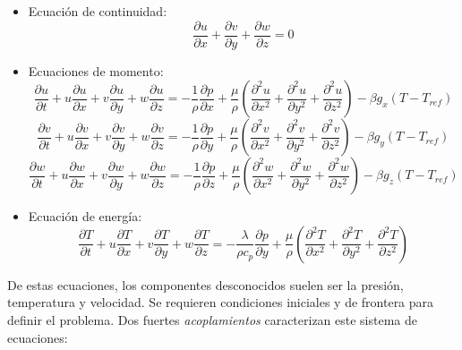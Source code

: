 \begin{itemize}
	\item Ecuaci\'on de continuidad:
	\begin{equation*}
		\frac{\partial u}{\partial x} + \frac{\partial v}{\partial y} + \frac{\partial w}{\partial z} = 0
	\end{equation*}
	\item Ecuaciones de momento:
	\begin{equation*}
			\frac{\partial u}{\partial t} + u \frac{\partial u}{\partial x} + v \frac{\partial u}{\partial y} + w \frac{\partial u}{\partial z} = - \frac{1}{\rho} \frac{\partial p}{\partial x} + \frac{\mu}{\rho} \left( \frac{\partial ^2 u}{\partial x ^2} + \frac{\partial ^2 u}{\partial y ^2} + \frac{\partial ^2 u}{\partial z ^2} \right) - \beta g_x \left(T - T_{ref} \right)
	\end{equation*}
	\begin{equation*}
			\frac{\partial v}{\partial t} + u \frac{\partial v}{\partial x} + v \frac{\partial v}{\partial y} + w \frac{\partial v}{\partial z} = - \frac{1}{\rho} \frac{\partial p}{\partial y} + \frac{\mu}{\rho} \left( \frac{\partial ^2 v}{\partial x ^2} + \frac{\partial ^2 v}{\partial y ^2} + \frac{\partial ^2 v}{\partial z ^2} \right) - \beta g_y \left(T - T_{ref} \right)
	\end{equation*}
	\begin{equation*}
			\frac{\partial w}{\partial t} + u \frac{\partial w}{\partial x} + v \frac{\partial w}{\partial y} + w \frac{\partial w}{\partial z} = - \frac{1}{\rho} \frac{\partial p}{\partial z} + \frac{\mu}{\rho} \left( \frac{\partial ^2 w}{\partial x ^2} + \frac{\partial ^2 w}{\partial y ^2} + \frac{\partial ^2 w}{\partial z ^2} \right) - \beta g_z \left(T - T_{ref} \right)
	\end{equation*}
	\item Ecuaci\'on de energ\'ia:
	\begin{equation*}
			\frac{\partial T}{\partial t} + u \frac{\partial T}{\partial x} + v \frac{\partial T}{\partial y} + w \frac{\partial T}{\partial z} = - \frac{\lambda}{\rho c_p} \frac{\partial p}{\partial y} + \frac{\mu}{\rho} \left( \frac{\partial ^2 T}{\partial x ^2} + \frac{\partial ^2 T}{\partial y ^2} + \frac{\partial ^2 T}{\partial z ^2} \right)
	\end{equation*}
\end{itemize}

\noindent
\justify

De estas ecuaciones, los componentes desconocidos suelen ser la presi\'on, temperatura y velocidad. Se requieren condiciones iniciales y de frontera para definir el problema. Dos fuertes \textit{acoplamientos} caracterizan este sistema de ecuaciones:

